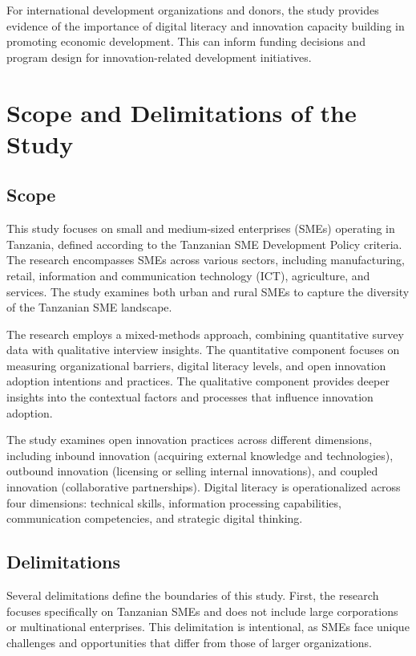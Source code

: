 \documentclass[12pt,a4paper]{article}
\begin{document}
For international development organizations and donors, the study provides evidence of the importance of digital literacy and innovation capacity building in promoting economic development. This can inform funding decisions and program design for innovation-related development initiatives.

\section{Scope and Delimitations of the Study}

\subsection{Scope}

This study focuses on small and medium-sized enterprises (SMEs) operating in Tanzania, defined according to the Tanzanian SME Development Policy criteria. The research encompasses SMEs across various sectors, including manufacturing, retail, information and communication technology (ICT), agriculture, and services. The study examines both urban and rural SMEs to capture the diversity of the Tanzanian SME landscape.

The research employs a mixed-methods approach, combining quantitative survey data with qualitative interview insights. The quantitative component focuses on measuring organizational barriers, digital literacy levels, and open innovation adoption intentions and practices. The qualitative component provides deeper insights into the contextual factors and processes that influence innovation adoption.

The study examines open innovation practices across different dimensions, including inbound innovation (acquiring external knowledge and technologies), outbound innovation (licensing or selling internal innovations), and coupled innovation (collaborative partnerships). Digital literacy is operationalized across four dimensions: technical skills, information processing capabilities, communication competencies, and strategic digital thinking.

\subsection{Delimitations}

Several delimitations define the boundaries of this study. First, the research focuses specifically on Tanzanian SMEs and does not include large corporations or multinational enterprises. This delimitation is intentional, as SMEs face unique challenges and opportunities that differ from those of larger organizations.
\end{document}
